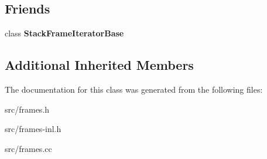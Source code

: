 \subsection*{Friends}
\begin{DoxyCompactItemize}
\item 
\hypertarget{classv8_1_1internal_1_1_optimized_frame_ac7310421866976ca454bbe11c5f926c3}{}class {\bfseries Stack\+Frame\+Iterator\+Base}\label{classv8_1_1internal_1_1_optimized_frame_ac7310421866976ca454bbe11c5f926c3}

\end{DoxyCompactItemize}
\subsection*{Additional Inherited Members}


The documentation for this class was generated from the following files\+:\begin{DoxyCompactItemize}
\item 
src/frames.\+h\item 
src/frames-\/inl.\+h\item 
src/frames.\+cc\end{DoxyCompactItemize}
